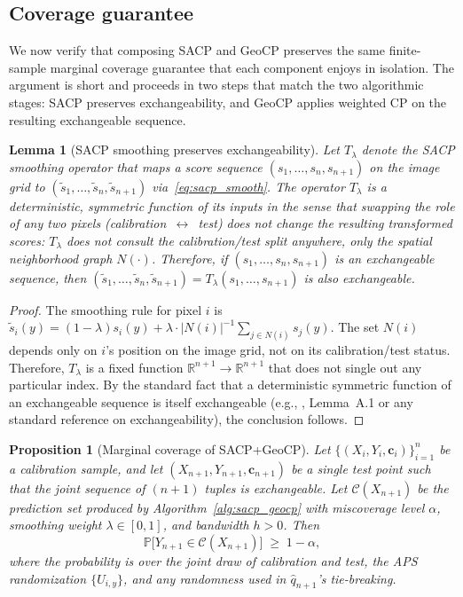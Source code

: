 \documentclass[11pt]{article}
\newtheorem{proposition}{Proposition}
\newtheorem{lemma}{Lemma}
\newcommand{\R}{\mathbb{R}}
\newcommand{\1}{\mathbf{1}}
\newcommand{\Prob}{\mathbb{P}}
\begin{document}
\subsection{Coverage guarantee}
\label{subsec:coverage}

We now verify that composing SACP and GeoCP preserves the same finite-sample marginal coverage guarantee that each component enjoys in isolation. The argument is short and proceeds in two steps that match the two algorithmic stages: SACP preserves exchangeability, and GeoCP applies weighted CP on the resulting exchangeable sequence.

\begin{lemma}[SACP smoothing preserves exchangeability]
\label{lem:sacp_symmetry}
Let $T_\lambda$ denote the SACP smoothing operator that maps a score sequence $(s_1, \ldots, s_n, s_{n+1})$ on the image grid to $(\tilde s_1, \ldots, \tilde s_n, \tilde s_{n+1})$ via~\eqref{eq:sacp_smooth}. The operator $T_\lambda$ is a deterministic, symmetric function of its inputs in the sense that swapping the role of any two pixels (calibration~$\leftrightarrow$~test) does not change the resulting transformed scores: $T_\lambda$ does not consult the calibration/test split anywhere, only the spatial neighborhood graph $N(\cdot)$. Therefore, if $(s_1, \ldots, s_n, s_{n+1})$ is an exchangeable sequence, then $(\tilde s_1, \ldots, \tilde s_n, \tilde s_{n+1}) = T_\lambda(s_1, \ldots, s_{n+1})$ is also exchangeable.
\end{lemma}

\begin{proof}
The smoothing rule for pixel $i$ is $\tilde s_i(y) = (1 - \lambda) s_i(y) + \lambda \cdot |N(i)|^{-1}\sum_{j \in N(i)} s_j(y)$. The set $N(i)$ depends only on $i$'s position on the image grid, not on its calibration/test status. Therefore, $T_\lambda$ is a fixed function $\R^{n+1} \to \R^{n+1}$ that does not single out any particular index. By the standard fact that a deterministic symmetric function of an exchangeable sequence is itself exchangeable (e.g., \citealp{vovk2005algorithmic}, Lemma~A.1 or any standard reference on exchangeability), the conclusion follows.
\end{proof}

\begin{proposition}[Marginal coverage of SACP+GeoCP]
\label{prop:coverage}
Let $\{(X_i, Y_i, \mathbf{c}_i)\}_{i=1}^n$ be a calibration sample, and let $(X_{n+1}, Y_{n+1}, \mathbf{c}_{n+1})$ be a single test point such that the joint sequence of $(n+1)$ tuples is exchangeable. Let $\mathcal{C}(X_{n+1})$ be the prediction set produced by Algorithm~\ref{alg:sacp_geocp} with miscoverage level $\alpha$, smoothing weight $\lambda \in [0, 1]$, and bandwidth $h > 0$. Then
\begin{equation}
    \Prob\bigl[Y_{n+1} \in \mathcal{C}(X_{n+1})\bigr] \;\ge\; 1 - \alpha,
    \label{eq:coverage}
\end{equation}
where the probability is over the joint draw of calibration and test, the APS randomization $\{U_{i,y}\}$, and any randomness used in $\hat q_{n+1}$'s tie-breaking.
\end{proposition}
\end{document}
